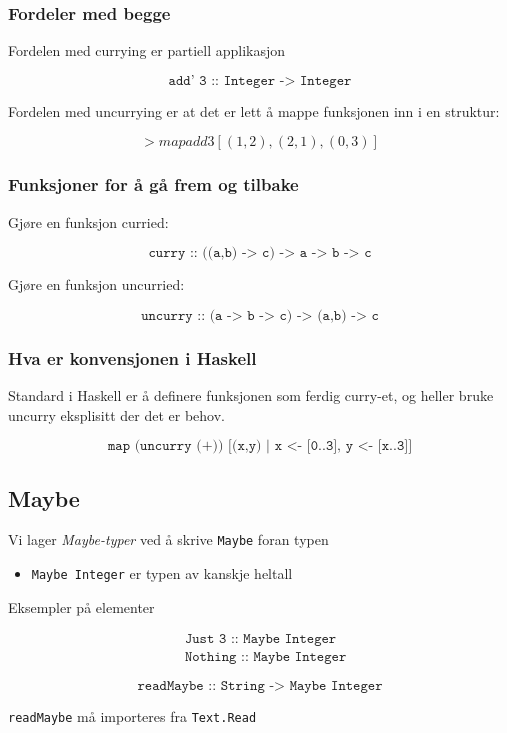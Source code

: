 \documentclass{article}
\begin{document}
\subsubsection{Fordeler med begge}
Fordelen med currying er partiell applikasjon

\[ \texttt{add' 3 :: Integer -> Integer} \]

Fordelen med uncurrying er at det er lett å mappe funksjonen inn i en struktur:

\[ > map add 3 [(1,2), (2,1), (0,3)] \]

\subsubsection{Funksjoner for å gå frem og tilbake}

Gjøre en funksjon curried:

\[ \texttt{curry :: ((a,b) -> c) -> a -> b -> c} \]

Gjøre en funksjon uncurried:

\[ \texttt{uncurry :: (a -> b -> c) -> (a,b) -> c} \]

\subsubsection{Hva er konvensjonen i Haskell}

Standard i Haskell er å definere funksjonen som ferdig curry-et, og heller bruke uncurry eksplisitt der det er behov.

\[ \texttt{map (uncurry (+)) [(x,y) | x <- [0..3], y <- [x..3]]} \]

\subsection{Maybe}

Vi lager \textit{Maybe-typer} ved å skrive \texttt{Maybe} foran typen

\begin{itemize}
    \item \texttt{Maybe Integer} er typen av kanskje heltall
\end{itemize}

\begin{eg}
    Eksempler på elementer

    \begin{align*}
        &\texttt{Just 3 :: Maybe Integer} \\
        &\texttt{Nothing :: Maybe Integer}
    \end{align*}

    \[ \texttt{readMaybe :: String -> Maybe Integer} \]

    \begin{note}
        \texttt{readMaybe} må importeres fra \texttt{Text.Read}
    \end{note}
\end{eg}
\end{document}
